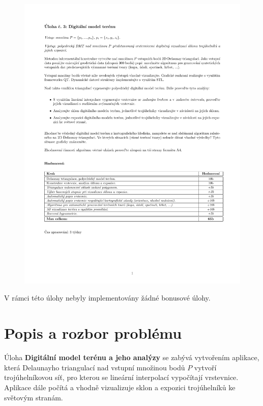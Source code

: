 \documentclass[a4paper, 12pt]{article}
\begin{document}
\begin{figure}[h!]
	\includegraphics[clip, trim=0cm 4.5cm 0cm 3cm, width=1.0\textwidth]{./pictures/zadani03.pdf}
\end{figure}

V rámci této úlohy nebyly implementovány žádné bonusové úlohy.
\clearpage

\section{Popis a rozbor problému}
Úloha \textbf{Digitální model terénu a jeho analýzy} se zabývá vytvořením aplikace, která Delaunayho triangulací nad vstupní množinou bodů $P$ vytvoří trojúhelníkovou síť, pro kterou se lineární interpolací vypočítají vrstevnice. Aplikace dále počítá a vhodně vizualizuje sklon a expozici trojúhelníků ke světovým stranám.\\ 
\end{document}
